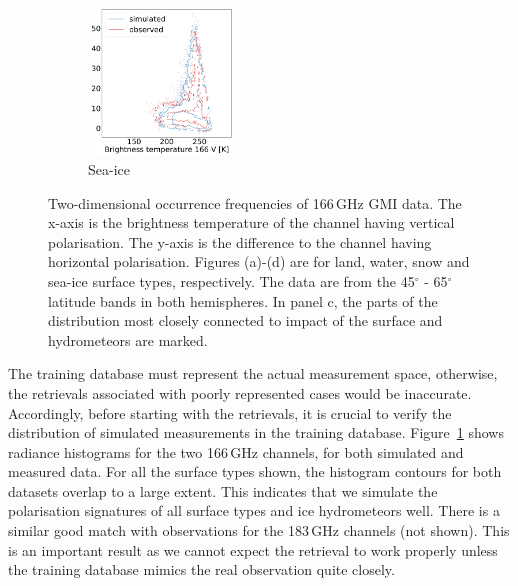 \documentclass[12pt,oneside,a4paper]{article}
\begin{document}
\begin{figure}[t]
\begin{subfigure}{.24\textwidth}
	\caption{ Sea-ice}
	\includegraphics[height = 39mm, width = 39mm]{Figures/hist2d_gmi_highlat_sea-ice.pdf}
\end{subfigure}
\caption{Two-dimensional occurrence frequencies of 166\,GHz GMI data. The x-axis
  is the brightness temperature of the channel having vertical polarisation.
  The y-axis is the difference to the channel having horizontal polarisation.
  Figures (a)-(d) are for land, water, snow and sea-ice surface types,
  respectively. The data are from the 45$^\circ$ - 65$^\circ$ latitude bands in
  both hemispheres. In panel c, the parts of the distribution most closely
  connected to impact of the surface and hydrometeors are marked.}
  \label{fig:histogram_2d}
\end{figure}

The training database must represent the actual measurement space, otherwise,
the retrievals associated with poorly represented cases would be inaccurate.
Accordingly, before starting with the retrievals, it is crucial to verify the
distribution of simulated measurements in the training database.
Figure~\ref{fig:histogram_2d} shows radiance histograms for the two 166\,GHz
channels, for both simulated and measured data. For all the surface types
shown, the histogram contours for both datasets overlap to a large extent. This
indicates that we simulate the polarisation signatures of all surface types and
ice hydrometeors well. There is a similar good match with observations for the
183\,GHz channels (not shown). This is an important result as we cannot expect
the retrieval to work properly unless the training database mimics the real
observation quite closely.
\end{document}
